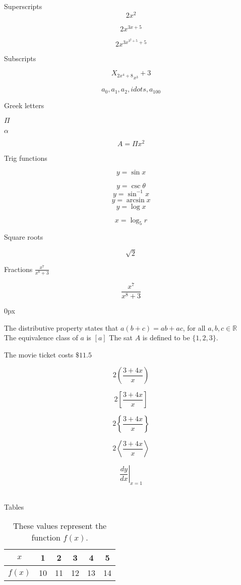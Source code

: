 \documentclass[11]{article}
\begin{document}
Superscripts $$2x^2$$

$$2x^{3x+5}$$

$$2x^{3x^{3^2+5}+5}$$


Subscripts

$${X_{2x^4+8}}_{x^3}+3$$


$$a_0, a_1, a_2, idots, a_{100}$$

Greek letters

$\Pi$

$\alpha$

$$A=\Pi x^2$$


Trig functions

$$y=\sin x $$

$$y=\csc \theta  $$
$$y=\sin^{-1} x$$
$$y=\arcsin x$$
$$y=\log x$$

$$x=\log_5 r$$

Square roots

$$\sqrt{2}$$


Fractions
$\frac{x^7}{x^8+3}$

$$\displaystyle\frac{x^7}{x^8+3}$$



\parindent 0px

The distributive property states that 
$a(b+c)=ab+ac$, for all $ a,b,c \in\mathbb{R}$ \\[6pt]
The equivalence class of $a$ is $[a]$
The sat $A$ is defined to be $\{1,2,3\}$.

The movie ticket costs $\$11.5$


$$2\left(\frac{3+4x}{x}\right)$$

$$2\left[\frac{3+4x}{x}\right]$$

$$2\left\{\frac{3+4x}{x}\right\}$$


$$2\left \langle  \frac{3+4x}{x} \right \rangle$$

$$\left. \frac{dy}{dx} \right|_{x=1}$$\






Tables\\
\begin{table}[H]
\centering
\def\arraystretch{2}
\begin{tabular}{|c|c|c|c|c|c|}
\hline
$x$&1&2&3&4&5\\ \hline
$f(x)$&10 &11&12&13&14\\ \hline
\end{tabular}
\caption{These values represent the function $f(x)$.}
\end{table}
\end{document}
